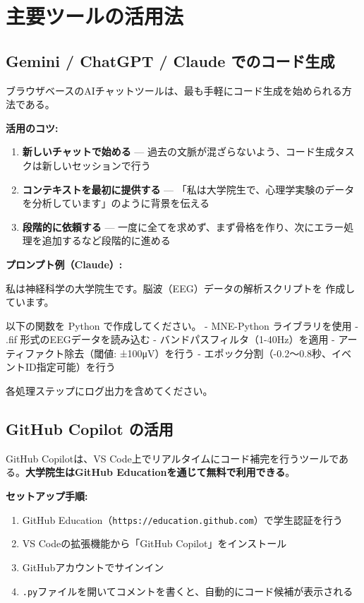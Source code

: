\section{主要ツールの活用法}
\label{sec:6.3}

\subsection{Gemini / ChatGPT / Claude でのコード生成}

ブラウザベースのAIチャットツールは、最も手軽にコード生成を始められる方法である。

\textbf{活用のコツ:}

\begin{enumerate}
\item \textbf{新しいチャットで始める} --- 過去の文脈が混ざらないよう、コード生成タスクは新しいセッションで行う
\item \textbf{コンテキストを最初に提供する} --- 「私は大学院生で、心理学実験のデータを分析しています」のように背景を伝える
\item \textbf{段階的に依頼する} --- 一度に全てを求めず、まず骨格を作り、次にエラー処理を追加するなど段階的に進める
\end{enumerate}

\textbf{プロンプト例（Claude）:}

\begin{promptbox}
私は神経科学の大学院生です。脳波（EEG）データの解析スクリプトを
作成しています。

以下の関数を Python で作成してください。
- MNE-Python ライブラリを使用
- .fif 形式のEEGデータを読み込む
- バンドパスフィルタ（1-40Hz）を適用
- アーティファクト除去（閾値: ±100μV）を行う
- エポック分割（-0.2〜0.8秒、イベントID指定可能）を行う

各処理ステップにログ出力を含めてください。
\end{promptbox}

\subsection{GitHub Copilot の活用}

GitHub Copilotは、VS Code上でリアルタイムにコード補完を行うツールである。\textbf{大学院生はGitHub Educationを通じて無料で利用できる}。

\textbf{セットアップ手順:}

\begin{enumerate}
\item GitHub Education（\texttt{https://education.github.com}）で学生認証を行う
\item VS Codeの拡張機能から「GitHub Copilot」をインストール
\item GitHubアカウントでサインイン
\item \texttt{.py}ファイルを開いてコメントを書くと、自動的にコード候補が表示される
\end{enumerate}

